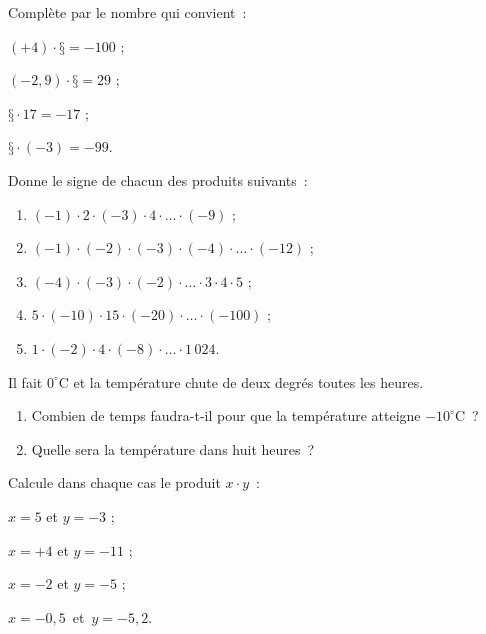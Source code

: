 \begin{exercice}
Complète par le nombre qui convient :
\begin{colenumerate}{2}
 \item $(+ 4) \cdot \text{§} = - 100$ ;
 \item $(- 2,9) \cdot \text{§} = 29$ ;  
 \item $\text{§} \cdot 17 = - 17$ ;
 \item $\text{§} \cdot (- 3) = - 99$.
 \end{colenumerate}
\end{exercice}


\begin{exercice}
Donne le signe de chacun des produits suivants :
\begin{enumerate}
 \item $(- 1) \cdot 2 \cdot (- 3) \cdot 4 \cdot \ldots \cdot (- 9)$ ;
 \item $(- 1) \cdot (- 2) \cdot (- 3) \cdot (- 4) \cdot \ldots \cdot (- 12)$ ;
 \item $(- 4) \cdot (- 3) \cdot (- 2) \cdot \ldots \cdot 3 \cdot 4 \cdot 5$ ;
 \item $5 \cdot (- 10) \cdot 15 \cdot (- 20) \cdot \ldots \cdot (- 100)$ ;
 \item $1 \cdot (- 2) \cdot 4 \cdot (- 8) \cdot \ldots \cdot 1\,024$.
 \end{enumerate}
\end{exercice}


\begin{exercice}[Températures]
Il fait $0^\circ$C et la température chute de deux degrés toutes les heures. 
\begin{enumerate}
 \item Combien de temps faudra-t-il pour que la température atteigne $- 10^\circ$C ?
 \item Quelle sera la température dans huit heures ?
 \end{enumerate}
\end{exercice}


\begin{exercice}
Calcule dans chaque cas le produit $x \cdot y$ :
\begin{colenumerate}{2}
 \item $x = 5$ et $y = - 3$ ;
 \item $x = + 4$ et $y = - 11$ ;
 \item $x = - 2$ et $y = - 5$ ;
 \item $x = - 0,5$ et $y = - 5,2$.
 \end{colenumerate}
\end{exercice}


